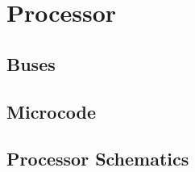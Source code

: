 \mainmatter






\setcounter{chapter}{0}

\renewcommand{\thepart}{\Alph{part}}
\renewcommand{\thechapter}{\Alph{part}\arabic{chapter}}
\renewcommand{\thepage}{\Alph{part}\arabic{chapter}-\arabic{page}}
\renewcommand{\thefigure}{\Alph{part}\arabic{chapter}.\arabic{figure}}
\renewcommand{\thetable}{\Alph{part}\arabic{chapter}.\arabic{schematic}}
\renewcommand{\thepage}{\thepart\thechapter-\arabic{page}}

\ifdefined\renderpartprocessor
  \part{Processor}
  \glsresetall

  
  
  \chapter{Buses}
  \glsresetall
  
  
  \chapter{Microcode}
  \glsresetall
  \label{chap:microcode}
  
  
  \chapter{Processor Schematics}
  \glsresetall
  \label{chap:processor-schematics}
  
\fi

